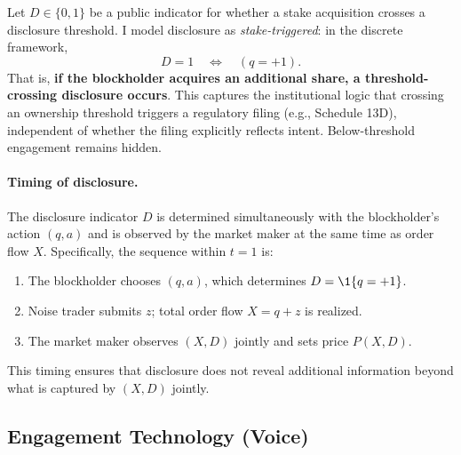 Let $D \in \{0, 1\}$ be a public indicator for whether a stake acquisition crosses a disclosure threshold. I model disclosure as \emph{stake-triggered}: in the discrete framework,
\[
D = 1 \quad \Longleftrightarrow \quad (q = +1).
\]
That is, \textbf{if the blockholder acquires an additional share, a threshold-crossing disclosure occurs}. This captures the institutional logic that crossing an ownership threshold triggers a regulatory filing (e.g., Schedule 13D), independent of whether the filing explicitly reflects intent. Below-threshold engagement remains hidden.

\paragraph{Timing of disclosure.} The disclosure indicator $D$ is determined simultaneously with the blockholder's action $(q, a)$ and is observed by the market maker at the same time as order flow $X$. Specifically, the sequence within $t=1$ is:
\begin{enumerate}[label=(\roman*),leftmargin=2em,itemsep=0pt]
\item The blockholder chooses $(q, a)$, which determines $D = \1\{q=+1\}$.
\item Noise trader submits $z$; total order flow $X = q + z$ is realized.
\item The market maker observes $(X, D)$ jointly and sets price $P(X, D)$.
\end{enumerate}
This timing ensures that disclosure does not reveal additional information beyond what is captured by $(X, D)$ jointly.

\subsection{Engagement Technology (Voice)}
\label{sec:engagement}

